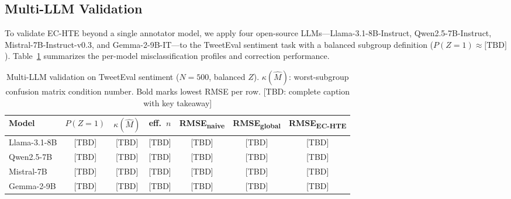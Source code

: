 

\subsection{Multi-LLM Validation}
\label{sec:multi_llm}

To validate EC-HTE beyond a single annotator model, we apply four open-source LLMs---Llama-3.1-8B-Instruct, Qwen2.5-7B-Instruct, Mistral-7B-Instruct-v0.3, and Gemma-2-9B-IT---to the TweetEval sentiment task with a balanced subgroup definition ($P(Z{=}1) \approx \text{[TBD]}$).
Table~\ref{tab:multi_llm} summarizes the per-model misclassification profiles and correction performance.




\begin{table}[t]
\centering
\caption{Multi-LLM validation on TweetEval sentiment ($N{=}500$, balanced $Z$). $\kappa(\hat{M})$: worst-subgroup confusion matrix condition number. Bold marks lowest RMSE per row. [TBD: complete caption with key takeaway]}
\label{tab:multi_llm}
\small
\begin{tabular}{lcccccc}
\toprule
Model & $P(Z{=}1)$ & $\kappa(\hat{M})$ & eff.\ $n$ & RMSE\textsubscript{naive} & RMSE\textsubscript{global} & RMSE\textsubscript{EC-HTE} \\
\midrule
Llama-3.1-8B & [TBD] & [TBD] & [TBD] & [TBD] & [TBD] & [TBD] \\
Qwen2.5-7B   & [TBD] & [TBD] & [TBD] & [TBD] & [TBD] & [TBD] \\
Mistral-7B   & [TBD] & [TBD] & [TBD] & [TBD] & [TBD] & [TBD] \\
Gemma-2-9B   & [TBD] & [TBD] & [TBD] & [TBD] & [TBD] & [TBD] \\
\bottomrule
\end{tabular}
\end{table}

